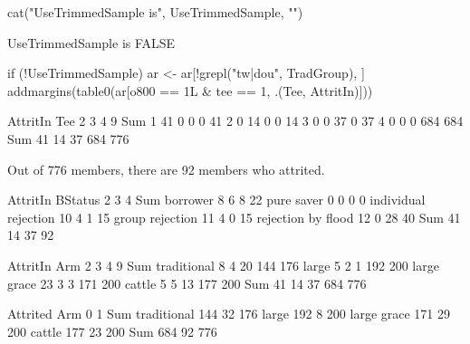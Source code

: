 \begin{Schunk}
\begin{Sinput}
cat("UseTrimmedSample is", UseTrimmedSample, "\n")
\end{Sinput}
\begin{Soutput}
UseTrimmedSample is FALSE 
\end{Soutput}
\begin{Sinput}
if (!UseTrimmedSample) 
  ar <- ar[!grepl("tw|dou", TradGroup), ]
addmargins(table0(ar[o800 == 1L & tee == 1, .(Tee, AttritIn)]))
\end{Sinput}
\begin{Soutput}
     AttritIn
Tee     2   3   4   9 Sum
  1    41   0   0   0  41
  2     0  14   0   0  14
  3     0   0  37   0  37
  4     0   0   0 684 684
  Sum  41  14  37 684 776
\end{Soutput}
\end{Schunk}
Out of 776 members, there are 92 members who attrited.
\begin{Schunk}
\begin{Soutput}
                      AttritIn
BStatus                 2  3  4 Sum
  borrower              8  6  8  22
  pure saver            0  0  0   0
  individual rejection 10  4  1  15
  group rejection      11  4  0  15
  rejection by flood   12  0 28  40
  Sum                  41 14 37  92
\end{Soutput}
\end{Schunk}



\begin{Schunk}
\begin{Soutput}
             AttritIn
Arm             2   3   4   9 Sum
  traditional   8   4  20 144 176
  large         5   2   1 192 200
  large grace  23   3   3 171 200
  cattle        5   5  13 177 200
  Sum          41  14  37 684 776
\end{Soutput}
\end{Schunk}
\begin{Schunk}
\begin{Soutput}
             Attrited
Arm             0   1 Sum
  traditional 144  32 176
  large       192   8 200
  large grace 171  29 200
  cattle      177  23 200
  Sum         684  92 776
\end{Soutput}
\end{Schunk}




